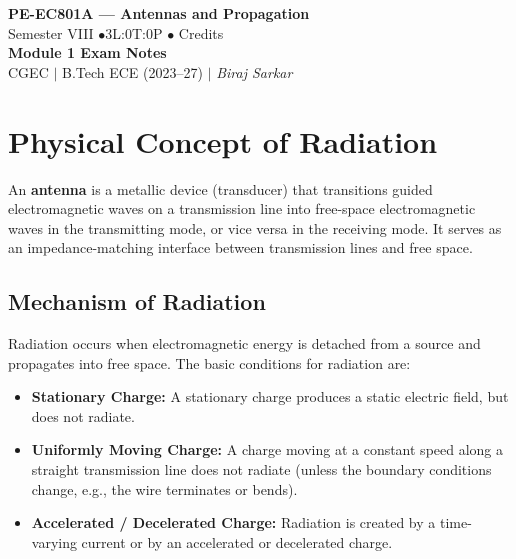 \documentclass[12pt,a4paper]{article}
\begin{document}

\begin{center}
  {\LARGE\bfseries\color{myred} PE-EC801A --- Antennas and Propagation}\\[5pt]
  {\normalsize\color{mydark} Semester VIII \quad$\bullet$\quad 3L:0T:0P \quad$\bullet$ Credits}\\[3pt]
  {\normalsize\color{myteal}\textbf{Module 1 Exam Notes}}\\[3pt]
  {\small\color{mydark} CGEC \;$|$\; B.Tech ECE (2023--27) \;$|$\; \textit{Biraj Sarkar}}
\end{center}
\vspace{2pt}
\noindent{\color{myred}\rule{\linewidth}{1.5pt}}
\vspace{2pt}

\hypersetup{linkcolor=mydark}
\tableofcontents
\hypersetup{linkcolor=myteal}
\newpage

\section{Physical Concept of Radiation}

\begin{tcolorbox}[defbox, title={\textbf{Definition of an Antenna}}]
An \textbf{antenna} is a metallic device (transducer) that transitions guided electromagnetic waves on a transmission line into free-space electromagnetic waves in the transmitting mode, or vice versa in the receiving mode. It serves as an impedance-matching interface between transmission lines and free space.
\end{tcolorbox}

\subsection{Mechanism of Radiation}
Radiation occurs when electromagnetic energy is detached from a source and propagates into free space. The basic conditions for radiation are:
\begin{itemize}[leftmargin=*, itemsep=3pt]
  \item \textbf{Stationary Charge:} A stationary charge produces a static electric field, but does not radiate.
  \item \textbf{Uniformly Moving Charge:} A charge moving at a constant speed along a straight transmission line does not radiate (unless the boundary conditions change, e.g., the wire terminates or bends).
  \item \textbf{Accelerated / Decelerated Charge:} Radiation is created by a time-varying current or by an accelerated or decelerated charge.
\end{itemize}
\end{document}
